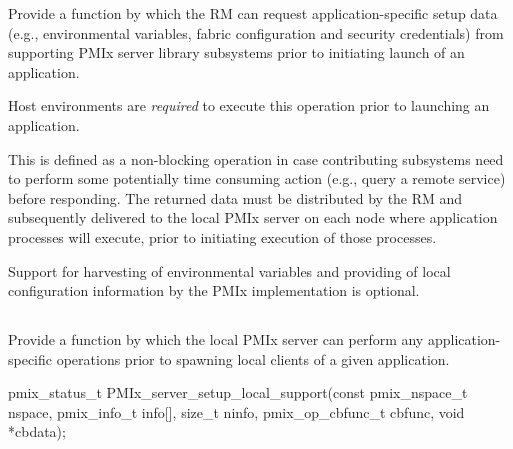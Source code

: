 \optattrend

\descr

Provide a function by which the \ac{RM} can request application-specific setup data (e.g., environmental variables, fabric configuration and security credentials) from supporting \ac{PMIx} server library subsystems prior to initiating launch of an application.

\advicermstart
Host environments are \textit{required} to execute this operation prior to launching an application.
\advicermend

This is defined as a non-blocking operation in case contributing subsystems need to perform some potentially time consuming action (e.g., query a remote service) before responding. The returned data must be distributed by the \ac{RM} and subsequently delivered to the local \ac{PMIx} server on each node where application processes will execute, prior to initiating execution of those processes.

\adviceimplstart
Support for harvesting of environmental variables and providing of local configuration information by the \ac{PMIx} implementation is optional.
\adviceimplend

\subsection{}

\summary

Provide a function by which the local \ac{PMIx} server can perform any application-specific operations prior to spawning local clients of a given application.

\format

\cspecificstart
\begin{codepar}
pmix_status_t
PMIx_server_setup_local_support(const pmix_nspace_t nspace,
                                pmix_info_t info[], size_t ninfo,
                                pmix_op_cbfunc_t cbfunc,
                                void *cbdata);
\end{codepar}
\cspecificend

\begin{arglist}
\end{arglist}

